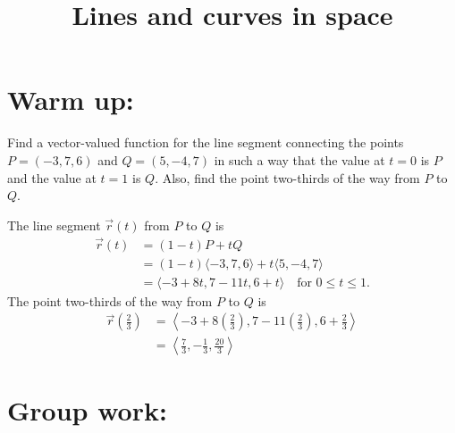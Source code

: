 \documentclass[]{ximera}
\title{Lines and curves in space}
\begin{document}
\begin{abstract}		\end{abstract}
\maketitle



\section{Warm up:}
Find a vector-valued function for the line segment connecting the points $P = (-3,7,6)$ and $Q = (5,-4,7)$ in such a way that the value at $t=0$ is $P$ and the value at $t=1$ is $Q$.  
Also, find the point two-thirds of the way from $P$ to $Q$.
	\begin{freeResponse}
	The line segment $\vec{r}(t)$ from $P$ to $Q$ is 
		\begin{align*}
		\vec{r}(t) &= (1-t)P + tQ  \\
		&= (1-t) \langle -3,7,6 \rangle + t \langle 5,-4,7 \rangle  \\
		&= \boxed{\langle -3 + 8t, 7 - 11t, 6 + t \rangle \quad \text{for }0 \leq t \leq 1}.
		\end{align*}
	The point two-thirds of the way from $P$ to $Q$ is
		\begin{align*}
		\vec{r} \left( \frac{2}{3} \right)
		&= \left\langle -3 + 8 \left( \frac{2}{3} \right), 7 - 11\left( \frac{2}{3} \right), 6 + \frac{2}{3} \right\rangle  \\
		&= \boxed{\left\langle \frac{7}{3} , - \frac{1}{3}, \frac{20}{3} \right\rangle}
		\end{align*}
	\end{freeResponse}
	
\begin{instructorNotes}
\end{instructorNotes}







\section{Group work:}
\end{document}
